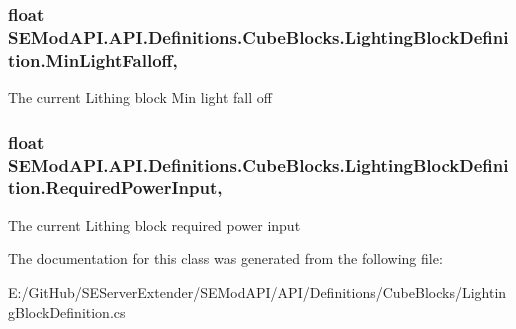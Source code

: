 \subsubsection[{Min\+Light\+Falloff}]{\setlength{\rightskip}{0pt plus 5cm}float S\+E\+Mod\+A\+P\+I.\+A\+P\+I.\+Definitions.\+Cube\+Blocks.\+Lighting\+Block\+Definition.\+Min\+Light\+Falloff\hspace{0.3cm}{\ttfamily [get]}, {\ttfamily [set]}}\label{class_s_e_mod_a_p_i_1_1_a_p_i_1_1_definitions_1_1_cube_blocks_1_1_lighting_block_definition_a6e2a26ba946df8f7443938b0f6a9c784}


The current Lithing block Min light fall off 

\hypertarget{class_s_e_mod_a_p_i_1_1_a_p_i_1_1_definitions_1_1_cube_blocks_1_1_lighting_block_definition_a1562c4dc2373a848976776a40ecdfb48}{}
\subsubsection[{Required\+Power\+Input}]{\setlength{\rightskip}{0pt plus 5cm}float S\+E\+Mod\+A\+P\+I.\+A\+P\+I.\+Definitions.\+Cube\+Blocks.\+Lighting\+Block\+Definition.\+Required\+Power\+Input\hspace{0.3cm}{\ttfamily [get]}, {\ttfamily [set]}}\label{class_s_e_mod_a_p_i_1_1_a_p_i_1_1_definitions_1_1_cube_blocks_1_1_lighting_block_definition_a1562c4dc2373a848976776a40ecdfb48}


The current Lithing block required power input 



The documentation for this class was generated from the following file\+:\begin{DoxyCompactItemize}
\item 
E\+:/\+Git\+Hub/\+S\+E\+Server\+Extender/\+S\+E\+Mod\+A\+P\+I/\+A\+P\+I/\+Definitions/\+Cube\+Blocks/Lighting\+Block\+Definition.\+cs\end{DoxyCompactItemize}
